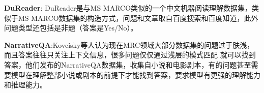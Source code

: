 \textbf{DuReader}: \quad DuReader是与MS MARCO类似的一个中文机器阅读理解数据集，类似于MS MARCO数据集的构造方式，问题和文章取自百度搜索和百度知道，此外问题类型还包括是非题（答案是Yes/No）。


\textbf{NarrativeQA}:\quad Kovcisky等人认为现在MRC领域大部分数据集的问题过于肤浅，而且答案往往只关注上下文信息，很多问题仅仅通过浅层的模式匹配
就可以找到答案，他们发布的NarrativeQA数据集，收集自小说和电影剧本，有的问题甚至需要模型在理解整部小说或剧本的前提下才能找到答案，要求模型有更强的理解能力和推理能力。



